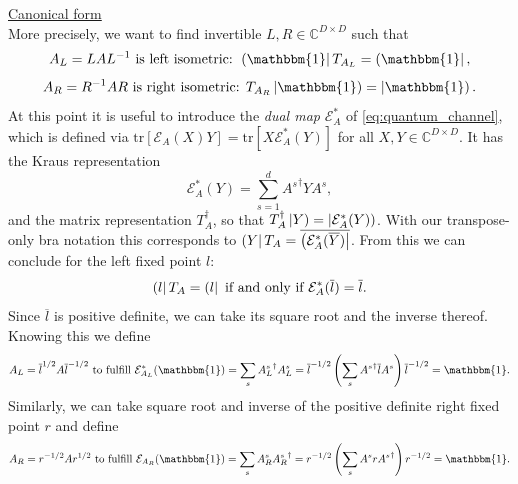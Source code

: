 \noindent \underline{Canonical form} \\[0.5em]
\noindent More precisely, we want to find invertible $L, R \in \mathbb{C}^{D \times D}$ such that
\begin{equation} \label{eq:left_gauge}
	A_L = L A L^{-1} \text{ is left isometric: } \tbra{\mathbbm{1}} T_{A_L} = \tbra{\mathbbm{1}},
\end{equation}
\begin{equation} \label{eq:right_gauge}
	A_R = R^{-1} A R \text{ is right isometric: } T_{A_R} \tket{\mathbbm{1}}  = \tket{\mathbbm{1}}.
\end{equation}
At this point it is useful to introduce the \textit{dual map} $\mathcal{E}^*_A$ of \eqref{eq:quantum_channel}, which is defined via $\mathrm{tr}[\mathcal{E}_A(X) Y] = \mathrm{tr}[X \mathcal{E}^*_A(Y)]$ for all $X, Y \in \mathbb{C}^{D \times D}$. It has the Kraus representation 
\begin{equation}
	\mathcal{E}^*_A(Y) =  \sum_{s=1}^d {A^s}^{\dagger} Y A^s,
\end{equation}
and the matrix representation $T_A^{\dagger}$, so that $T_A^{\dagger} \left| Y \right) = \left| \mathcal{E}^*_A(Y) \right)$. With our transpose-only bra notation this corresponds to $\left( Y \right| T_A = \overline{\left( \mathcal{E}^*_A(\overline{Y}) \right|}$. From this we can conclude for the left fixed point $l$:
\begin{equation} \label{eq:left_fixed_point_dual}
	\left( l \right| T_A = \left( l \right| \text{ if and only if } \mathcal{E}^*_A(\overline{l}) = \overline{l}. \\
\end{equation}
Since $\overline{l}$ is positive definite, we can take its square root and the inverse thereof. Knowing this we define
\begin{equation} \label{eq:AL_from_square_root}
	A_L = \overline{l}^{1/2} A \overline{l}^{-1/2} \text{ to fulfill } \mathcal{E}^*_{A_L}(\mathbbm{1}) =  \sum_{s} {A^s_L}^{\dagger} A^s_L =  \overline{l}^{-1/2} \left( \sum_{s} {A^s}^{\dagger} \overline{l} A^s \right) \overline{l}^{-1/2} = \mathbbm{1}.
\end{equation}
 Similarly, we can take square root and inverse of the positive definite right fixed point $r$ and define 
 \begin{equation} \label{eq:AR_from_square_root}
 	A_R = r^{-1/2} A r^{1/2} \text{ to fulfill } \mathcal{E}_{A_R} (\mathbbm{1}) = \sum_s A_R^s {A_R^s}^{\dagger} = r^{-1/2} \left( \sum_s A^s r {A^s}^{\dagger} \right) r^{-1/2} = \mathbbm{1}. 
 \end{equation}
